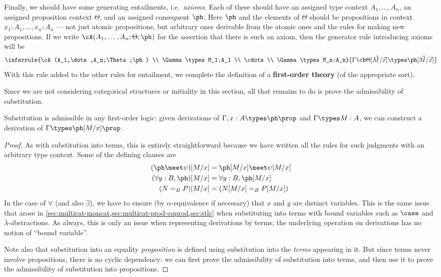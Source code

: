 Finally, we should have some generating entailments, i.e.\ \emph{axioms}.
Each of these should have an assigned type context $A_1,\dots,A_n$, an assigned proposition context $\Theta$, and an assigned consequent $\ph$.
Here $\ph$ and the elements of $\Theta$ should be propositions in context $x_1:A_1,\dots,x_n:A_n$ --- not just atomic propositions, but arbitrary ones derivable from the atomic ones and the rules for making new propositions.
If we write $\cA(A_1,\dots,A_n;\Theta;\ph)$ for the assertion that there is such an axiom, then the generator rule introducing axioms will be
\[ \inferrule{\cA(A_1,\dots,A_n;\Theta;\ph) \\ \Gamma\types M_1:A_1 \\ \cdots\\ \Gamma\types M_n:A_n}{\Gamma \cb \Theta[\vec M/\vec x]\types \ph[\vec M/\vec x]} \]
With this rule added to the other rules for entailment, we complete the definition of a \textbf{first-order theory} (of the appropriate sort).

Since we are not considering categorical structures or initiality in this section, all that remains to do is prove the admissibility of substitution.

\begin{thm}\label{thm:fol-subprop-adm}
  Substitution is admissible in any first-order logic: given derivations of $\Gamma,x:A \types \ph\prop$ and $\Gamma\types M:A$, we can construct a derivation of $\Gamma \types \ph[M/x]\prop$.
\end{thm}
\begin{proof}
  As with substitution into terms, this is entirely straightforward because we have written all the rules for such judgments with an arbitrary type context.
  Some of the defining clauses are
  \begin{align*}
    (\ph\meet\psi)[M/x] &= \ph[M/x] \meet \psi[M/x]\\
    (\forall y:B,\ph)[M/x] &= \forall y:B,\ph[M/x]\\
    (N=_B P)[M/x] &= (N[M/x] =_B P[M/x])
  \end{align*}
  In the case of $\forall$ (and also $\exists$), we have to ensure (by $\alpha$-equivalence if necessary) that $x$ and $y$ are distinct variables.
  This is the same issue that arose in \cref{sec:multicat-moncat,sec:multicat-prod-coprod,sec:stlc} when substituting into terms with bound variables such as $\case$ and $\lambda$-abstractions.
  As always, this is only an issue when representing derivations by terms; the underlying operation on derivations has no notion of ``bound variable''.

  Note also that substitution into an equality \emph{proposition} is defined using substitution into the \emph{terms} appearing in it.
  But since terms never involve propositions, there is no cyclic dependency: we can first prove the admissibility of substitution into terms, and then use it to prove the admissibility of substitution into propositions.
\end{proof}

